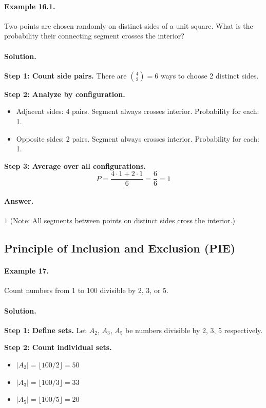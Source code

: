 \documentclass[12pt]{extarticle}
\begin{document}
\paragraph{Example 16.1.} Two points are chosen randomly on distinct sides of a unit square. What is the probability their connecting segment crosses the interior?

\paragraph{Solution.}
\textbf{Step 1: Count side pairs.} There are $\binom{4}{2} = 6$ ways to choose 2 distinct sides.

\textbf{Step 2: Analyze by configuration.}
\begin{itemize}
    \item Adjacent sides: 4 pairs. Segment always crosses interior. Probability for each: 1.
    \item Opposite sides: 2 pairs. Segment always crosses interior. Probability for each: 1.
\end{itemize}

\textbf{Step 3: Average over all configurations.}
\[
P = \frac{4 \cdot 1 + 2 \cdot 1}{6} = \frac{6}{6} = 1
\]

\paragraph{Answer.} $\boxed{1}$ (Note: All segments between points on distinct sides cross the interior.)

\subsection{Principle of Inclusion and Exclusion (PIE)}

\paragraph{Example 17.} Count numbers from 1 to 100 divisible by 2, 3, or 5.

\paragraph{Solution.}
\textbf{Step 1: Define sets.} Let $A_2$, $A_3$, $A_5$ be numbers divisible by 2, 3, 5 respectively.

\textbf{Step 2: Count individual sets.}
\begin{itemize}
    \item $|A_2| = \lfloor 100/2 \rfloor = 50$
    \item $|A_3| = \lfloor 100/3 \rfloor = 33$
    \item $|A_5| = \lfloor 100/5 \rfloor = 20$
\end{itemize}
\end{document}
